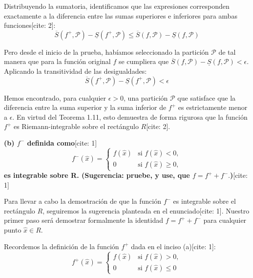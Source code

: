 \documentclass[11pt,letterpaper]{article}
\begin{document}
Distribuyendo la sumatoria, identificamos que las expresiones corresponden exactamente a la diferencia entre las sumas superiores e inferiores para ambas funciones[cite: 2]:
\begin{equation*}
\overline{S}(f^{+},\mathcal{P}) - \underline{S}(f^{+},\mathcal{P}) \le \overline{S}(f,\mathcal{P}) - \underline{S}(f,\mathcal{P})
\end{equation*}

Pero desde el inicio de la prueba, habíamos seleccionado la partición $\mathcal{P}$ de tal manera que para la función original $f$ se cumpliera que $\overline{S}(f,\mathcal{P}) - \underline{S}(f,\mathcal{P}) < \epsilon$. Aplicando la transitividad de las desigualdades:
\begin{equation*}
\overline{S}(f^{+},\mathcal{P}) - \underline{S}(f^{+},\mathcal{P}) < \epsilon
\end{equation*}

Hemos encontrado, para cualquier $\epsilon > 0$, una partición $\mathcal{P}$ que satisface que la diferencia entre la suma superior y la suma inferior de $f^{+}$ es estrictamente menor a $\epsilon$. En virtud del Teorema 1.11, esto demuestra de forma rigurosa que la función $f^{+}$ es Riemann-integrable sobre el rectángulo $R$[cite: 2].

\textbf{(b) $f^{-}$ definida como}[cite: 1]
\begin{equation*}
f^{-}(\hat{x})=\begin{cases}f(\hat{x})&\text{si } f(\hat{x})<0,\\ 0&\text{si } f(\hat{x})\ge0,\end{cases}
\end{equation*}
\textbf{es integrable sobre R. (Sugerencia: pruebe, y use, que $f=f^{+}+f^{-}.$)}[cite: 1]

Para llevar a cabo la demostración de que la función $f^{-}$ es integrable sobre el rectángulo $R$, seguiremos la sugerencia planteada en el enunciado[cite: 1]. Nuestro primer paso será demostrar formalmente la identidad $f = f^{+} + f^{-}$ para cualquier punto $\hat{x} \in R$.

Recordemos la definición de la función $f^{+}$ dada en el inciso (a)[cite: 1]:
\begin{equation*}
f^{+}(\hat{x})=\begin{cases}f(\hat{x})&\text{si } f(\hat{x})>0,\\ 0&\text{si } f(\hat{x})\le0\end{cases}
\end{equation*}
\end{document}
